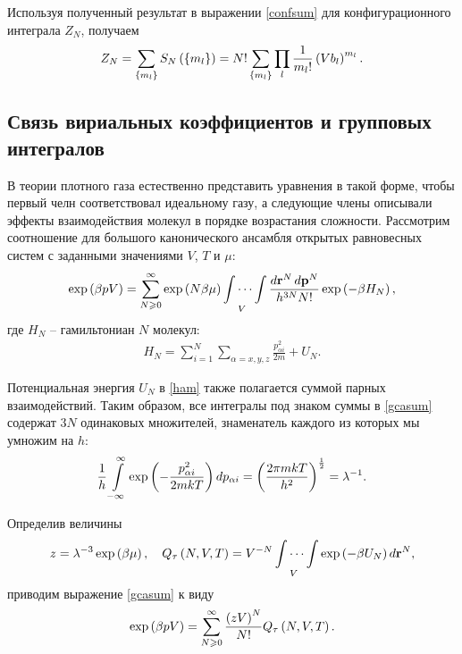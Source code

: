Используя полученный результат в выражении \eqref{confsum} для конфигурационного интеграла $Z_N$, получаем
\vverh
\begin{gather}
	Z_N = \sum_{\left\{ m_l \right\}} S_N \left( \left\{ m_l \right\} \right) = N! \sum_{\left\{ m_l \right\}} \prod_l \frac{1}{m_l!} \left( V b_l \right)^{m_l}. \label{confsum2}
\end{gather}

\subsection{Связь вириальных коэффициентов и групповых интегралов \cite{mayer, meyson}}

В теории плотного газа естественно представить уравнения в такой форме, чтобы первый челн соответствовал идеальному газу, а следующие члены описывали эффекты взаимодействия молекул в порядке возрастания сложности. Рассмотрим соотношение для большого канонического ансамбля открытых равновесных систем с заданными значениями $V$, $T$ и $\mu$:
\vverh
\begin{gather}
	\exp \left( \beta p V \right) = \sum_{N \geqslant 0}^\infty \exp \left( N \beta \mu \right) \idotsint\limits_V \frac{d \mathbf{r}^N \, d \mathbf{p}^N}{h^{3N} N!} \exp \left( - \beta H_N \right), \label{gcasum}
\end{gather}
где $H_N$ -- гамильтониан $N$ молекул:
\vverh
\begin{gather}
	H_N = \sum_{i = 1}^N \sum_{\alpha = x, y, z} \frac{p_{\alpha i}^2}{2 m} + U_N. \label{ham}
\end{gather}

Потенциальная энергия $U_N$ в \eqref{ham} также полагается суммой парных взаимодействий. Таким образом, все интегралы под знаком суммы в \eqref{gcasum} содержат $3N$ одинаковых множителей, знаменатель каждого из которых мы умножим на $h$:
\vverh
\begin{gather}
	\frac{1}{h} \int\limits_{-\infty}^{\infty} \exp \left( - \frac{p_{\alpha i}^2}{2m kT} \right) d p_{\alpha i} = \left( \frac{2 \pi m k T}{h^2} \right)^{\frac{1}{2}} = \lambda^{-1}. \notag
\end{gather}

Определив величины
\vverh
\begin{gather}
	z = \lambda^{-3} \exp \left( \beta \mu \right), \quad Q_{\tau} \left( N, V, T \right) = V^{-N} \idotsint\limits_V \exp \left( - \beta U_N \right) d \mathbf{r}^N, \notag
\end{gather}
приводим выражение \eqref{gcasum} к виду
\vverh
\begin{gather}
	\exp \left( \beta p V \right) = \sum_{N \geqslant 0}^\infty \frac{ \left( z V \right)^N}{N!} Q_\tau \left( N, V, T \right). \label{gcasum2} 
\end{gather}

